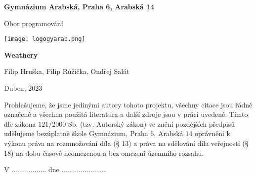 \begin{titlepage}
\begin{center}
\large \vspace*{\fill}
\thispagestyle{empty}

\LARGE

{ \huge \textbf{Gymnázium Arabská, Praha 6, Arabská 14}}

{\LARGE Obor programování }

\vfill
\texttt{[image: logogyarab.png]}
\vspace{15pt}

\vfill

{\huge \textbf{Weathery}}

\vfill

Filip Hruška, Filip Růžička, Ondřej Salát

\vfill

{\large Duben, 2023}

\vspace*{\fill}
\end{center}
\end{titlepage}

\thispagestyle{empty}
\addtocounter{page}{-1}
\vspace*{\fill}
Prohlašujeme, že jsme jedinými autory tohoto projektu, všechny citace jsou řádně označené a všechna 
použitá literatura a další zdroje jsou v práci uvedené. Tímto dle zákona 121/2000 Sb. (tzv. Autorský zákon) 
ve znění pozdějších předpisů udělujeme bezúplatně škole Gymnázium, Praha 6, Arabská 14 oprávnění k výkonu 
práva na rozmnožování díla (§ 13) a práva na sdělování díla veřejnosti (§ 18) na dobu časově neomezenou a 
bez omezení územního rozsahu.

\vspace{2cm}
V .................. dne .......................


\vspace{2cm}


\vspace{2cm}


